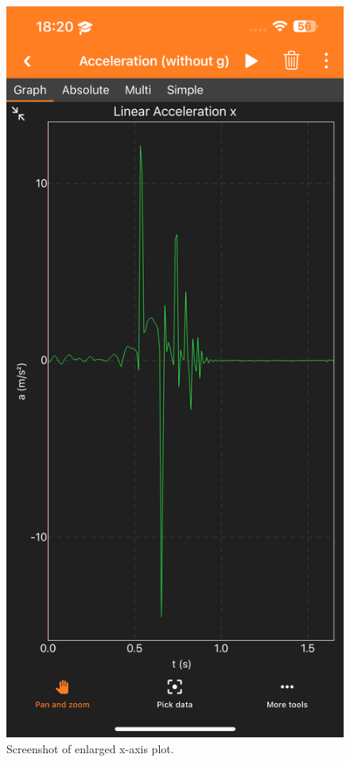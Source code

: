 \documentclass[idxtotoc,hyperref,openany]{labbook} %
\begin{document}
\begin{figure}[H] %
\begin{center}
\includegraphics[width=.7\linewidth]{images/Lab.02/PhoneDropX.PNG}
\end{center}
\caption{Screenshot of enlarged x-axis plot.}
\label{fig:Lab02-PhoneDropX}
\end{figure}
\end{document}
